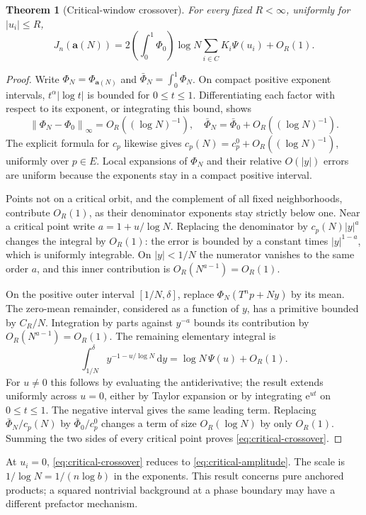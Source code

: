 \documentclass[11pt,a4paper]{article}
\numberwithin{equation}{section}
\newtheorem{theorem}{Theorem}[section]
\theoremstyle{definition}
\theoremstyle{remark}
\newcommand{\dd}{\,\mathrm d}
\newcommand{\ee}{\mathrm e}
\newcommand{\norm}[1]{\left\lVert #1\right\rVert}
\begin{document}
\begin{theorem}[Critical-window crossover]
\label{thm:crossover}
For every fixed $R<\infty$, uniformly for $|u_i|\le R$,
\begin{equation}
 J_n(\boldsymbol a(N))
 =2\left(\int_0^1\Phi_0\right)\log N
       \sum_{i\in C}K_i\Psi(u_i)+O_R(1).
 \label{eq:critical-crossover}
\end{equation}
\end{theorem}
\begin{proof}
Write $\Phi_N=\Phi_{\boldsymbol a(N)}$ and
$\bar\Phi_N=\int_0^1\Phi_N$. On compact positive exponent intervals,
$t^\alpha|\log t|$ is bounded for $0\le t\le1$. Differentiating each
factor with respect to its exponent, or integrating this bound, shows
\[
 \norm{\Phi_N-\Phi_0}_\infty=O_R((\log N)^{-1}),\quad
 \bar\Phi_N=\bar\Phi_0+O_R((\log N)^{-1}).
\]
The explicit formula for $c_p$ likewise gives
$c_p(N)=c_p^0+O_R((\log N)^{-1})$, uniformly over $p\in E$.
Local expansions of $\Phi_N$ and their relative $O(|y|)$ errors are
uniform because the exponents stay in a compact positive interval.

Points not on a critical orbit, and the complement of all fixed
neighborhoods, contribute $O_R(1)$, as their denominator exponents stay
strictly below one. Near a critical point write
$a=1+u/\log N$. Replacing the denominator by $c_p(N)|y|^a$
changes the integral by $O_R(1)$: the error is bounded by a constant
times $|y|^{1-a}$, which is uniformly integrable. On $|y|<1/N$ the
numerator vanishes to the same order $a$, and this inner contribution
is $O_R(N^{a-1})=O_R(1)$.

On the positive outer interval $[1/N,\delta]$, replace
$\Phi_N(T^np+Ny)$ by its mean. The zero-mean remainder, considered as
a function of $y$, has a primitive bounded by $C_R/N$. Integration
by parts against $y^{-a}$ bounds its contribution by
$O_R(N^{a-1})=O_R(1)$. The remaining elementary integral is
\begin{equation}
 \int_{1/N}^{\delta}y^{-1-u/\log N}\dd y
       =\log N\,\Psi(u)+O_R(1).
 \label{eq:window-integral}
\end{equation}
For $u\ne0$ this follows by evaluating the antiderivative; the result
extends uniformly across $u=0$, either by Taylor expansion or by
integrating $\ee^{ut}$ on $0\le t\le1$.
The negative interval gives the same leading term. Replacing
$\bar\Phi_N/c_p(N)$ by $\bar\Phi_0/c_p^0$ changes a term of size
$O_R(\log N)$ by only $O_R(1)$. Summing the two sides of every
critical point proves \cref{eq:critical-crossover}.
\end{proof}
At $u_i=0$, \cref{eq:critical-crossover} reduces to
\cref{eq:critical-amplitude}. The scale is $1/\log N=1/(n\log b)$
in the exponents. This result concerns pure anchored products; a
squared nontrivial background at a phase boundary may have a different
prefactor mechanism.
\end{document}
